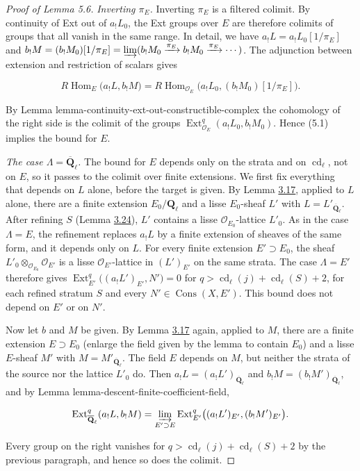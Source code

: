 \documentclass[11pt]{article}
\providecommand{\Cons}{}\renewcommand{\Cons}{\operatorname{Cons}}
\providecommand{\Ext}{}\renewcommand{\Ext}{\operatorname{Ext}}
\begin{document}
\begin{proof}[{Proof of Lemma 5.6}]
\emph{Inverting \(\pi_E\).} Inverting \(\pi_E\) is a filtered colimit. By continuity of Ext out of \(a_!L_0\), the Ext groups over \(E\) are therefore colimits of groups that all vanish in the same range. In detail, we have \(a_!L=a_!L_0[1/\pi_E]\) and \(b_!M=(b_!M_0)[1/\pi_E]=\varinjlim(b_!M_0\xrightarrow{\pi_E}b_!M_0\xrightarrow{\pi_E}\cdots)\). The adjunction between extension and restriction of scalars gives

\[
R\!\operatorname{Hom}_E\bigl(a_!L,b_!M\bigr)
=R\!\operatorname{Hom}_{\mathcal O_E}\bigl(a_!L_0,(b_!M_0)[1/\pi_E]\bigr).
\]

By Lemma lemma-continuity-ext-out-constructible-complex the cohomology of the right side is the colimit of the groups \(\Ext^q_{\mathcal O_E}(a_!L_0,b_!M_0)\). Hence (5.1) implies the bound for \(E\).

\emph{The case \(\Lambda=\overline{\mathbf Q}_\ell\).} The bound for \(E\) depends only on the strata and on \(\operatorname{cd}_\ell\), not on \(E\), so it passes to the colimit over finite extensions. We first fix everything that depends on \(L\) alone, before the target is given. By Lemma \hyperref[bp245]{3.17}, applied to \(L\) alone, there are a finite extension \(E_0/\mathbf Q_\ell\) and a lisse \(E_0\)-sheaf \(L'\) with \(L=L'_{\overline{\mathbf Q}_\ell}\). After refining \(S\) (Lemma \hyperref[bp269]{3.24}), \(L'\) contains a lisse \(\mathcal O_{E_0}\)-lattice \(L'_0\). As in the case \(\Lambda=E\), the refinement replaces \(a_!L\) by a finite extension of sheaves of the same form, and it depends only on \(L\). For every finite extension \(E'\supset E_0\), the sheaf \(L'_0\otimes_{\mathcal O_{E_0}}\mathcal O_{E'}\) is a lisse \(\mathcal O_{E'}\)-lattice in \((L')_{E'}\) on the same strata. The case \(\Lambda=E'\) therefore gives \(\Ext^q_{E'}\bigl((a_!L')_{E'},N'\bigr)=0\) for \(q>\operatorname{cd}_\ell(j)+\operatorname{cd}_\ell(S)+2\), for each refined stratum \(S\) and every \(N'\in\Cons(X,E')\). This bound does not depend on \(E'\) or on \(N'\).

Now let \(b\) and \(M\) be given. By Lemma \hyperref[bp245]{3.17} again, applied to \(M\), there are a finite extension \(E\supset E_0\) (enlarge the field given by the lemma to contain \(E_0\)) and a lisse \(E\)-sheaf \(M'\) with \(M=M'_{\overline{\mathbf Q}_\ell}\). The field \(E\) depends on \(M\), but neither the strata of the source nor the lattice \(L'_0\) do. Then \(a_!L=(a_!L')_{\overline{\mathbf Q}_\ell}\) and \(b_!M=(b_!M')_{\overline{\mathbf Q}_\ell}\), and by Lemma lemma-descent-finite-coefficient-field,

\[
\Ext^q_{\overline{\mathbf Q}_\ell}(a_!L,b_!M)
=\varinjlim_{E'\supset E}\Ext^q_{E'}\bigl((a_!L')_{E'},(b_!M')_{E'}\bigr).
\]

Every group on the right vanishes for \(q>\operatorname{cd}_\ell(j)+\operatorname{cd}_\ell(S)+2\) by the previous paragraph, and hence so does the colimit.
\end{proof}
\end{document}
